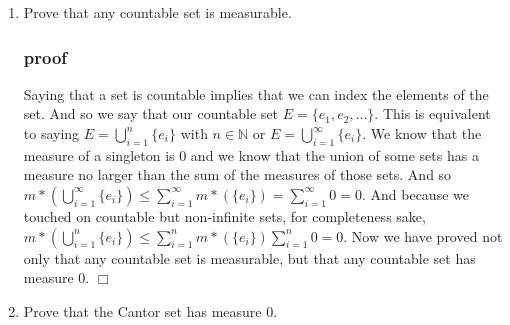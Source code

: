 \documentclass[letterpaper]{article}
\begin{document}
\begin{enumerate}


\item
Prove that any countable set is measurable.
\subsubsection*{proof}
Saying that a set is countable implies that we can index the elements of the set. And so we say that our countable set $E=\{e_1,e_2,\dots\}$. This is equivalent to saying $E=\bigcup\limits_{i=1}^n\{e_i\}$ with $n\in \mathbb{N}$ or $E=\bigcup\limits_{i=1}^\infty\{e_i\}$. We know that the measure of a singleton is 0 and we know that the union of some sets has a measure no larger than the sum of the measures of those sets. And so $m*(\bigcup\limits_{i=1}^\infty\{e_i\})\le \sum\limits_{i=1}^\infty{m*(\{e_i\})}=\sum\limits_{i=1}^\infty{0}=0$. And because we touched on countable but non-infinite sets, for completeness sake, $m*(\bigcup\limits_{i=1}^n\{e_i\})\le \sum\limits_{i=1}^n{m*(\{e_i\})} \sum\limits_{i=1}^n{0}=0$. Now we have proved not only that any countable set is measurable, but that any countable set has measure 0. $\Box$
\item
Prove that the Cantor set has measure $0$.

\end{enumerate}
\end{document}
